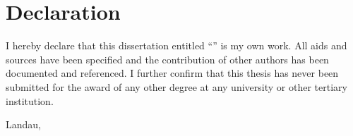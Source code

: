 
\chapter{Declaration}

I hereby declare that this dissertation entitled ``\plaintitle '' is my own work. All aids and sources have been specified and the contribution of other authors has been documented and referenced.
I further confirm that this thesis has never been submitted for the award of any other degree at any university or other tertiary institution.

\vspace{6em}

\noindent Landau, \thedate

